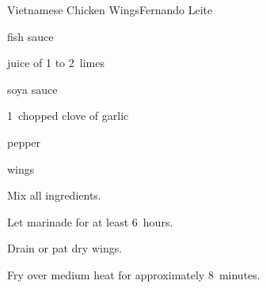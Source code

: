 \begin{recipe}{Vietnamese Chicken Wings}{Fernando Leite}{}

\begin{ingredients}
\item {} fish sauce
\item juice of 1 to 2~limes
\item {} soya sauce
\item 1~chopped clove of garlic
\item pepper
\item {} wings
\end{ingredients}

\begin{directions}
\item Mix all ingredients.
\item Let marinade for at least 6~hours.
\item Drain or pat dry wings.
\item Fry over medium heat for approximately 8~minutes.
\end{directions}

\end{recipe}
